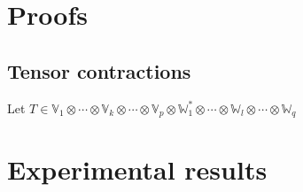 \documentclass[11pt,a4paper,openright,oneside]{book}
\numberwithin{equation}{section}
\newtheorem{defn0}{Definition}[chapter]
\newenvironment{definition}{ \begin{defn0}}{\end{defn0}}
\begin{document}
\normalfont


\newpage

\printbibliography

\appendix
\chapter{Proofs}
\section{Tensor contractions}

Let $T \in \mathbb{V}_1 \otimes \cdots \otimes \mathbb{V}_k \otimes \cdots \otimes \mathbb{V}_p \otimes \mathbb{W}_1^* \otimes \cdots
\otimes \mathbb{W}_l \otimes \cdots \otimes \mathbb{W}_q$

 
\chapter{Experimental results}
\end{document}
